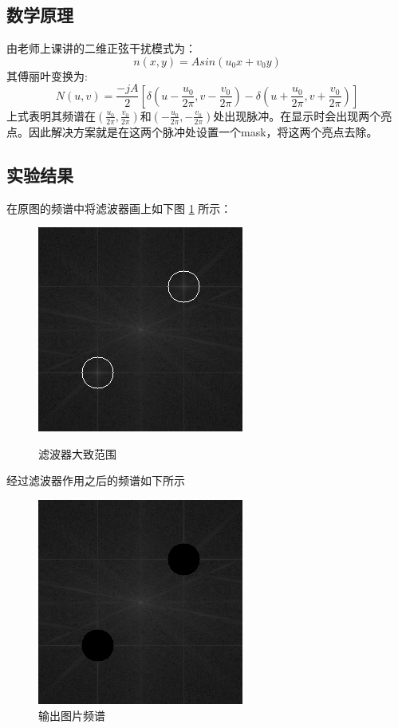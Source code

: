 \documentclass{article}
\begin{document}
		\subsection{数学原理}
			由老师上课讲的二维正弦干扰模式为：
			$$n( x , y) = Asin(u_0x+v_0y)$$
			其傅丽叶变换为:
			$$ N(u , v ) = \frac{-jA}{2}[\delta(u-\frac{u_0}{2\pi} , v - \frac{v_0}{2\pi}) - \delta(u + \frac{u_0}{2\pi} , v + \frac{v_0}{2\pi})]$$
			上式表明其频谱在$(\frac{u_0}{2\pi} , \frac{v_0}{2\pi})$和$(-\frac{u_0}{2\pi} , -\frac{v_0}{2\pi})$处出现脉冲。在显示时会出现两个亮点。因此解决方案就是在这两个脉冲处设置一个mask，将这两个亮点去除。
		\subsection{实验结果}
			在原图的频谱中将滤波器画上如下图 \ref{滤波器范围} 所示：
			\begin{figure}[H]
				\centering
				\includegraphics[scale = 0.7]{fft_masked.png} \label{滤波器范围}
				\caption{滤波器大致范围}
			\end{figure}
			
			经过滤波器作用之后的频谱如下所示
			\begin{figure}[H]
				\centering
				\includegraphics[scale = 0.7]{fft_newimg.png} 
				\caption{输出图片频谱}
			\end{figure}
			
\end{document}
